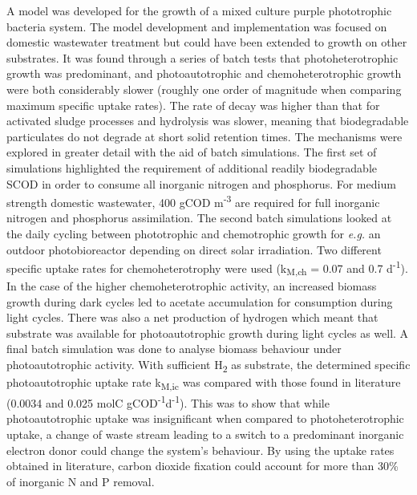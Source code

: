 A model was developed for the growth of a mixed culture purple phototrophic bacteria system. The model development and implementation was focused on domestic wastewater treatment but could have been extended to growth on other substrates. It was found through a series of batch tests that photoheterotrophic growth was predominant, and photoautotrophic and chemoheterotrophic growth were both considerably slower (roughly one order of magnitude when comparing maximum specific uptake rates).  The rate of decay was higher than that for activated sludge processes and hydrolysis was slower, meaning that biodegradable particulates do not degrade at short solid retention times. 
\skippingparagraph
The mechanisms were explored in greater detail with the aid of batch simulations. The first set of simulations highlighted the requirement of additional readily biodegradable SCOD in order to consume all inorganic nitrogen and phosphorus. For medium strength domestic wastewater, 400 gCOD m\textsuperscript{-3} are required for full inorganic nitrogen and phosphorus assimilation. The second batch simulations looked at the daily cycling between phototrophic and chemotrophic growth for \textit{e.g.} an outdoor photobioreactor depending on direct solar irradiation. Two different specific uptake rates for chemoheterotrophy were used (k\textsubscript{M,ch} = 0.07 and 0.7 d\textsuperscript{-1}). In the case of the higher chemoheterotrophic activity, an increased biomass growth during dark cycles led to acetate accumulation for consumption during light cycles. There was also a net production of hydrogen which meant that substrate was available for photoautotrophic growth during light cycles as well. A final batch simulation was done to analyse biomass behaviour under photoautotrophic activity. With sufficient H\textsubscript{2} as substrate, the determined specific photoautotrophic uptake rate k\textsubscript{M,ic} was compared with those found in literature (\num{0.0034} and \num{0.025} molC gCOD\textsuperscript{-1}d\textsuperscript{-1}). This was to show that while photoautotrophic uptake was insignificant when compared to photoheterotrophic uptake, a change of waste stream leading to a switch to a predominant inorganic electron donor could change the system's behaviour. By using the uptake rates obtained in literature, carbon dioxide fixation could account for more than 30\% of inorganic N and P removal.
\skippingparagraph
